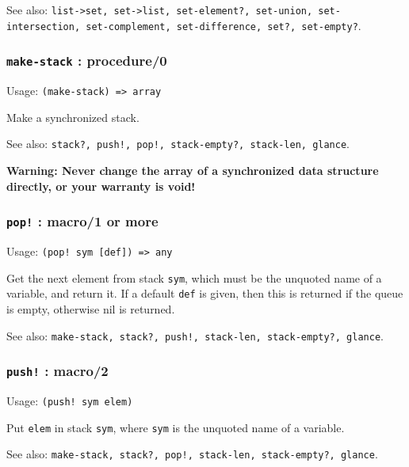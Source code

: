 \documentclass[
]{article}
\newcommand{\passthrough}[1]{#1}
\begin{document}
See also:
\passthrough{\lstinline!list->set, set->list, set-element?, set-union, set-intersection, set-complement, set-difference, set?, set-empty?!}.

\hypertarget{make-stack-procedure0}{%
\subsubsection{\texorpdfstring{\texttt{make-stack} :
procedure/0}{make-stack : procedure/0}}\label{make-stack-procedure0}}

Usage: \passthrough{\lstinline!(make-stack) => array!}

Make a synchronized stack.

See also:
\passthrough{\lstinline"stack?, push!, pop!, stack-empty?, stack-len, glance"}.

\textbf{Warning: Never change the array of a synchronized data structure
directly, or your warranty is void!}

\hypertarget{pop-macro1-or-more}{%
\subsubsection{\texorpdfstring{\texttt{pop!} : macro/1 or
more}{pop! : macro/1 or more}}\label{pop-macro1-or-more}}

Usage: \passthrough{\lstinline"(pop! sym [def]) => any"}

Get the next element from stack \passthrough{\lstinline!sym!}, which
must be the unquoted name of a variable, and return it. If a default
\passthrough{\lstinline!def!} is given, then this is returned if the
queue is empty, otherwise nil is returned.

See also:
\passthrough{\lstinline"make-stack, stack?, push!, stack-len, stack-empty?, glance"}.

\hypertarget{push-macro2}{%
\subsubsection{\texorpdfstring{\texttt{push!} :
macro/2}{push! : macro/2}}\label{push-macro2}}

Usage: \passthrough{\lstinline"(push! sym elem)"}

Put \passthrough{\lstinline!elem!} in stack
\passthrough{\lstinline!sym!}, where \passthrough{\lstinline!sym!} is
the unquoted name of a variable.

See also:
\passthrough{\lstinline"make-stack, stack?, pop!, stack-len, stack-empty?, glance"}.
\end{document}
